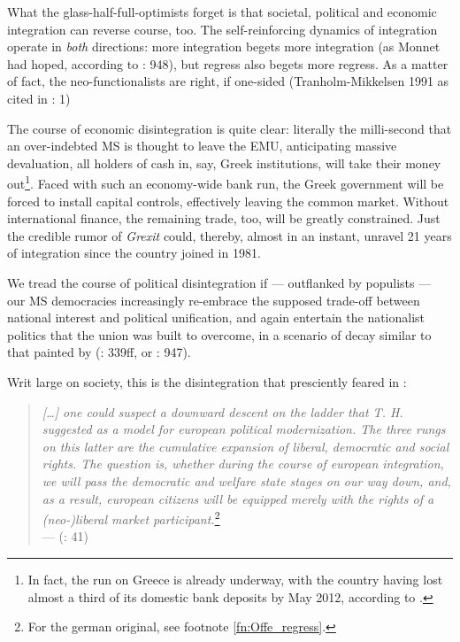 \documentclass[11pt,a4paper,oneside,openright]{article}
\begin{document}
What the glass-half-full-optimists forget is that societal, political and economic integration can reverse course, too. The self-reinforcing dynamics of integration operate in \emph{both} directions: more integration begets more integration (as Monnet had hoped, according to \citealt{Schmitter1999}: 948), but regress also begets more regress. As a matter of fact, the neo-functionalists are right, if one-sided (Tranholm-Mikkelsen 1991 as cited in \citealt{Bieler2003}: 1)

The course of economic disintegration is quite clear: literally the milli-second that an over-indebted \gls{MS} is thought to leave the \gls{EMU}, anticipating massive devaluation, all holders of cash in, say, Greek institutions, will take their money out\footnote{
	In fact, the run on Greece is already underway, with the country having lost almost a third of its domestic bank deposits by May 2012, according to \cite{TheEconomist2012}.}. 
Faced with such an economy-wide bank run, the Greek government will be forced to install capital controls, effectively leaving the common market. Without international finance, the remaining trade, too, will be greatly constrained. Just the credible rumor of \emph{Grexit} could, thereby, almost in an instant, unravel 21 years of integration since the country joined in 1981.

We tread the course of political disintegration if --- outflanked by populists --- our \gls{MS} democracies increasingly re-embrace the supposed trade-off between national interest and political unification, and again entertain the nationalist politics that the union was built to overcome, in a scenario of decay similar to that painted by \citeauthor{BeckGrande-2007-aa} (\citeauthor{BeckGrande-2007-aa}: 339ff, or \citealt{Schmitter1999}: 947).

Writ large on society, this is the disintegration that \citeauthor{Offe1998} presciently feared in \citeyear{Offe1998}:
\begin{quote}
	\emph{[\ldots] one could suspect a downward descent on the ladder that T. H. \cite{Marshall-1950-aa} suggested as a model for european political modernization. The three rungs on this latter are the cumulative expansion of liberal, democratic and social rights. The question is, whether during the course of european integration, we will pass the democratic and welfare state stages on our way down, and, as a result, european citizens will be equipped merely with the rights of a (neo-)liberal market participant.}\footnote{
		For the german original, see footnote \ref{fn:Offe_regress}.}\\
	--- \citeauthor{Offe1998} (\citeyear{Offe1998}: 41)
\end{quote}
\end{document}
